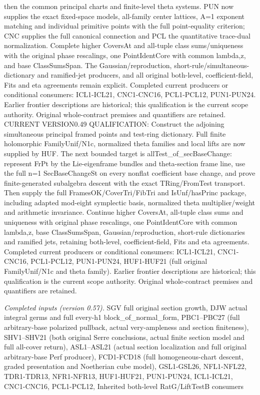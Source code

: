 \documentclass[11pt,a4paper]{article}
\numberwithin{equation}{section}
\theoremstyle{remark}\newtheorem{remark}[theorem]{Remark}
\begin{document}
then the common principal charts and finite-level theta systems. PUN now supplies the exact fixed-space models, all-family center lattices, A=1 exponent matching and individual primitive points with the full point-equality criterion; CNC supplies the full canonical connection and PCL the quantitative trace-dual normalization. Complete higher CoversAt and all-tuple class sums/uniqueness with the original phase rescalings, one PointIdentCore with common lambda,z, and base ClassSumsSpan. The Gaussian/reproduction, short-rule/simultaneous-dictionary and ramified-jet producers, and all original both-level, coefficient-field, Fits and eta agreements remain explicit. Completed current producers or conditional consumers: ICL1-ICL21, CNC1-CNC16, PCL1-PCL12, PUN1-PUN24. Earlier frontier descriptions are historical; this qualification is the current scope authority. Original whole-contract premises and quantifiers are retained. CURRENT VERSION0.49 QUALIFICATION: Construct the adjoining simultaneous principal framed points and test-ring dictionary. Full finite holomorphic FamilyUnif/N1c, normalized theta families and local lifts are now supplied by HUF. The next bounded target is allTest\_\allowbreak of\_\allowbreak secBaseChange: represent FrPt by the Lie-eigenframe bundles and theta-section frame line, use the full n=1 SecBaseChangeSt on every nonflat coefficient base change, and prove finite-generated subalgebra descent with the exact TRing/FromTest transport. Then supply the full FramesOK/CoverTri/FibTri and IsUnf/hasPrinc package, including adapted mod-eight symplectic basis, normalized theta multiplier/weight and arithmetic invariance. Continue higher CoversAt, all-tuple class sums and uniqueness with original phase rescalings, one PointIdentCore with common lambda,z, base ClassSumsSpan, Gaussian/reproduction, short-rule dictionaries and ramified jets, retaining both-level, coefficient-field, Fits and eta agreements. Completed current producers or conditional consumers: ICL1-ICL21, CNC1-CNC16, PCL1-PCL12, PUN1-PUN24, HUF1-HUF21 (full original FamilyUnif/N1c and theta family). Earlier frontier descriptions are historical; this qualification is the current scope authority. Original whole-contract premises and quantifiers are retained.

\emph{Completed inputs (version 0.57).} SGV full original section growth, DJW actual integral germs and full every-h1 block\_\allowbreak of\_\allowbreak normal\_\allowbreak form, PBC1–PBC27 (full arbitrary-base polarized pullback, actual very-ampleness and section finiteness), SHV1–SHV21 (both original Serre conclusions, actual finite section model and full all-cover return), ASL1–ASL21 (actual section localization and full original arbitrary-base Perf producer), FCD1-FCD18 (full homogeneous-chart descent, graded presentation and Noetherian cube model), GSL1-GSL26, NFL1-NFL22, TDR1-TDR13, NFR1-NFR13, HUF1-HUF21, PUN1-PUN24, ICL1-ICL21, CNC1-CNC16, PCL1-PCL12, Inherited both-level RatG/LiftTestB consumers
\end{document}
